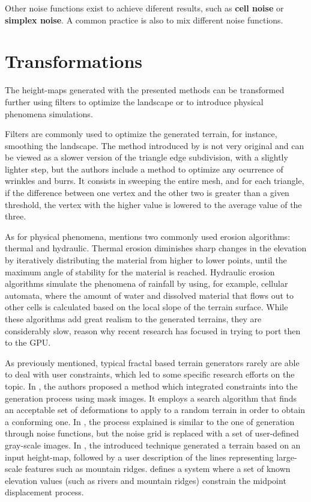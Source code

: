 \documentclass{acmtog}
\begin{document}
Other noise functions exist to achieve diferent results, such as \textbf{cell noise} or \textbf{simplex noise}. A common practice is also to mix different noise functions.

\section{Transformations}
The height-maps generated with the presented methods can be transformed further using filters to optimize the landscape or to introduce physical phenomena simulations.

Filters are commonly used to optimize the generated terrain, for instance, smoothing the landscape. The method introduced by \cite{Chen11} is not very original and can be viewed as a slower version of the triangle edge subdivision, with a slightly lighter step, but the authors include a method to optimize any ocurrence of wrinkles and burrs. It consists in sweeping the entire mesh, and for each triangle, if the difference between one vertex and the other two is greater than a given threshold, the vertex with the higher value is lowered to the average value of the three.

As for physical phenomena, \cite{Olsen04} mentions two commonly used erosion algorithms: thermal and hydraulic. Thermal erosion diminishes sharp changes in the elevation by iteratively distributing the material from higher to lower points, until the maximum angle of stability for the material is reached. Hydraulic erosion algorithms simulate the phenomena of rainfall by using, for example, cellular automata, where the amount of water and dissolved material that flows out to other cells is calculated based on the local slope of the terrain surface. While these algorithms add great realism to the generated terrains, they are considerably slow, reason why recent research has focused in trying to port then to the GPU.

As previously mentioned, typical fractal based terrain generators rarely are able to deal with user constraints, which led to some specific research efforts on the topic. In \cite{Stachniak05}, the authors proposed a method which integrated constraints into the generation process using mask images. It employs a search algorithm that finds an acceptable set of deformations to apply to a random terrain in order to obtain a conforming one. In \cite{Schneider06}, the process explained is similar to the one of generation through noise functions, but the noise grid is replaced with a set of user-defined gray-scale images. In \cite{Zhou07}, the introduced technique generated a terrain based on an input height-map, followed by a user description of the lines representing large-scale features such as mountain ridges. \cite{Belhadj07} defines a system where a set of known elevation values (such as rivers and mountain ridges) constrain the midpoint displacement process.
\end{document}
